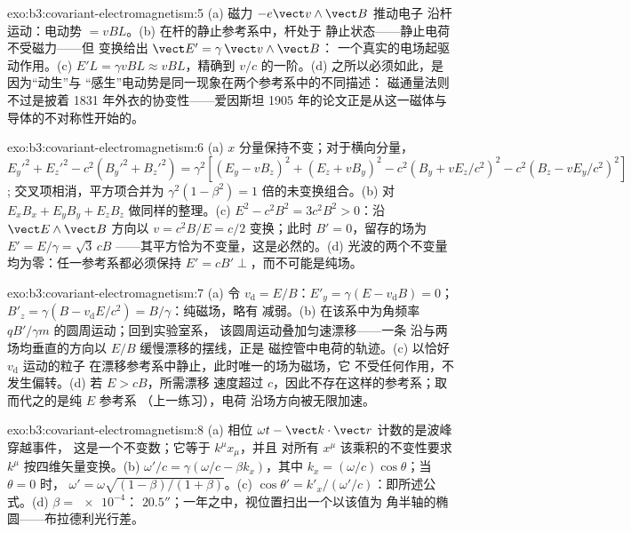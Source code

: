 \begin{solution}{exo:b3:covariant-electromagnetism:5}
(a) 磁力 $-e\vect v\wedge\vect B$ 推动电子
沿杆运动：电动势 $= vBL$。(b) 在杆的静止参考系中，杆处于
静止状态——静止电荷不受磁力——但
变换给出 $\vect E' = \gamma\,\vect v\wedge\vect B$：
一个真实的电场起驱动作用。(c) $E'L = \gamma vBL
\approx vBL$，精确到 $v/c$ 的一阶。(d) 之所以必须如此，是因为“动生”与
“感生”电动势是同一现象在两个参考系中的不同描述：
磁通量法则不过是披着 1831 年外衣的协变性——爱因斯坦
1905 年的论文正是从这一磁体与导体的不对称性开始的。
\end{solution}

\begin{solution}{exo:b3:covariant-electromagnetism:6}
(a) $x$ 分量保持不变；对于横向分量，
$E_y'^2 + E_z'^2 - c^2(B_y'^2 + B_z'^2) = \gamma^2[(E_y - vB_z)^2 +
(E_z + vB_y)^2 - c^2(B_y + vE_z/c^2)^2 - c^2(B_z - vE_y/c^2)^2]$;
交叉项相消，平方项合并为 $\gamma^2(1 -
\beta^2) = 1$ 倍的未变换组合。(b) 对
$E_xB_x + E_yB_y + E_zB_z$ 做同样的整理。(c) $E^2 - c^2B^2 =
3c^2B^2 > 0$：沿 $\vect E\wedge\vect B$ 方向以 $v = c^2B/E =
c/2$ 变换；此时 $B' = 0$，留存的场为 $E' = E/\gamma =
\sqrt3\,cB$ ——其平方恰为不变量，这是必然的。(d) 光波的两个不变量
均为零：任一参考系都必须保持 $E' = cB' \perp$，而不可能是纯场。
\end{solution}

\begin{solution}{exo:b3:covariant-electromagnetism:7}
(a) 令 $v_{\text{d}} = E/B$：$E'_y = \gamma(E - v_{\text{d}}B) =
0$；$B'_z = \gamma(B - v_{\text{d}}E/c^2) = B/\gamma$：纯磁场，略有
减弱。(b) 在该系中为角频率 $qB'/\gamma m$ 的圆周运动；回到实验室系，
该圆周运动叠加匀速漂移——一条
沿与两场均垂直的方向以 $E/B$ 缓慢漂移的摆线，正是
磁控管中电荷的轨迹。(c) 以恰好 $v_{\text{d}}$ 运动的粒子
在漂移参考系中静止，此时唯一的场为磁场，它
不受任何作用，不发生偏转。(d) 若 $E > cB$，所需漂移
速度超过 $c$，因此不存在这样的参考系；取而代之的是纯 $E$ 参考系
（上一练习），电荷
沿场方向被无限加速。
\end{solution}

\begin{solution}{exo:b3:covariant-electromagnetism:8}
(a) 相位 $\omega t - \vect k\cdot\vect r$ 计数的是波峰穿越事件，
这是一个不变数；它等于 $k^\mu x_\mu$，并且
对所有 $x^\mu$ 该乘积的不变性要求 $k^\mu$
按四维矢量变换。(b) $\omega'/c = \gamma(\omega/c -
\beta k_x)$，其中 $k_x = (\omega/c)\cos\theta$；当 $\theta = 0$ 时，
$\omega' = \omega\sqrt{(1-\beta)/(1+\beta)}$。(c) $\cos\theta' =
k'_x/(\omega'/c)$：即所述公式。(d) $\beta = \num{e-4}$：
$20.5''$；一年之中，视位置扫出一个以该值为
角半轴的椭圆——布拉德利光行差。
\end{solution}

